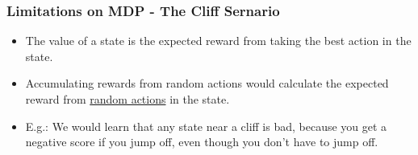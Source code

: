 \documentclass[aspectratio=169, 10pt]{beamer}
\begin{document}
\begin{frame}[t]
\frametitle{Limitations on MDP - The Cliff Sernario}

\begin{itemize}
    \item The value of a state is the expected reward from taking the best action in the state.
    \item Accumulating rewards from random actions would calculate the expected reward from \underline{random actions} in the state.
    \item E.g.: We would learn that any state near a cliff is bad, because you get a negative score if you jump off, even though you don't have to jump off.
\end{itemize}

\begin{figure}
\end{figure}
    
\end{frame}
\end{document}
